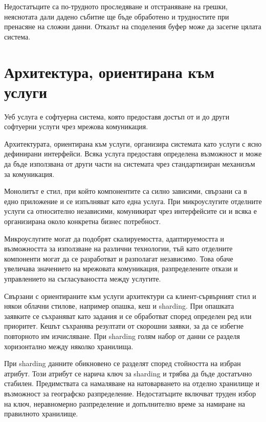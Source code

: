 Недостатъците са по-трудното проследяване и отстраняване на грешки, неяснотата дали дадено събитие ще бъде обработено и трудностите при пренасяне на сложни данни. Отказът на споделения буфер може да засегне цялата система.

\section{Архитектура, ориентирана към услуги}\label{s:27.5}

\begin{defn}
Уеб услуга е софтуерна система, която предоставя достъп от и до други софтуерни услуги чрез мрежова комуникация.
\end{defn}

Архитектурата, ориентирана към услуги, организира системата като услуги с ясно дефинирани интерфейси. Всяка услуга предоставя определена възможност и може да бъде използвана от други части на системата чрез стандартизиран механизъм за комуникация.

Монолитът е стил, при който компонентите са силно зависими, свързани са в едно приложение и се изпълняват като една услуга. При микроуслугите отделните услуги са относително независими, комуникират чрез интерфейсите си и всяка е организирана около конкретна бизнес потребност.

Микроуслугите могат да подобрят скалируемостта, адаптируемостта и възможността за използване на различни технологии, тъй като отделните компоненти могат да се разработват и разполагат независимо. Това обаче увеличава значението на мрежовата комуникация, разпределените откази и управлението на съгласуваността между услугите.

Свързани с ориентираните към услуги архитектури са клиент-сървърният стил и някои облачни стилове, например опашка, кеш и sharding. При опашката заявките се съхраняват като задания и се обработват според определен ред или приоритет. Кешът съхранява резултати от скорошни заявки, за да се избегне повторното им изчисляване. При sharding голям набор от данни се разделя хоризонтално между няколко хранилища.

При sharding данните обикновено се разделят според стойността на избран атрибут. Този атрибут се нарича ключ за sharding и трябва да бъде достатъчно стабилен. Предимствата са намаляване на натоварването на отделно хранилище и възможност за географско разпределение. Недостатъците включват труден избор на ключ, неравномерно разпределение и допълнително време за намиране на правилното хранилище.


